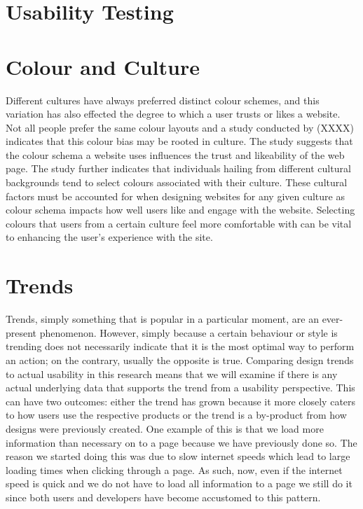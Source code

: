 \section{Usability Testing}

\section{Colour and Culture}
Different cultures have always preferred distinct colour schemes, and this variation has also effected the degree to which a user trusts or likes a website. Not all people prefer the same colour layouts and a study conducted by (XXXX) \cite{Color} indicates that this colour bias may be rooted in culture. The study suggests that the colour schema a website uses influences the trust and likeability of the web page. The study further indicates that individuals hailing from different cultural backgrounds tend to select colours associated with their culture. These cultural factors must be accounted for when designing websites for any given culture as colour schema impacts how well users like and engage with the website. Selecting colours that users from a certain culture feel more comfortable with can be vital to enhancing the user's experience with the site.
\section{Trends}
Trends, simply something that is popular in a particular moment, are an ever-present phenomenon. However, simply because a certain behaviour or style is trending does not necessarily indicate that it is the most optimal way to perform an action; on the contrary, usually the opposite is true. Comparing design trends to actual usability in this research means that we will examine if there is any actual underlying data that supports the trend from a usability perspective. This can have two outcomes: either the trend has grown because it more closely caters to how users use the respective products or the trend is a by-product from how designs were previously created. One example of this is that we load more information than necessary on to a page because we have previously done so. The reason we started doing this was due to slow internet speeds which lead to large loading times when clicking through a page. As such, now, even if the internet speed is quick and we do not have to load all information to a page we still do it since both users and developers have become accustomed to this pattern.

